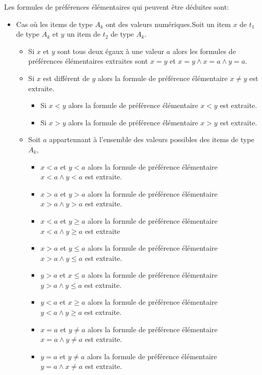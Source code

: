 \documentclass[a4paper,12pt,openany,oneside]{article}
\begin{document}
Les formules de préférences élémentaires qui peuvent être déduites sont:
\begin{itemize}
	
	\item Cas où les items de type $A_k$ ont des valeurs numériques.Soit un item $x$ de $t_1$ de type $A_k$ et $y$ un item de $t_2$ de type $A_k$.\\
	
	\begin{itemize}
	
		\item Si $x$ et $y$ sont tous deux égaux à une valeur $a$ alors les formules de préférences élémentaires extraites sont $x=y$ et $x=y\wedge x=a\wedge y=a$.
		\item Si $x$ est différent de $y$ alors la formule de préférence élémentaire $x\neq y$ est extraite. 

		\begin{itemize}
			\item Si $x<y$ alors la formule de préférence élémentaire $x<y$ est extraite.
			\item Si $x>y$ alors la formule de préférence élémentaire $x>y$ est extraite.
	
		\end{itemize}
		\item Soit $a$ appartennant à l'ensemble des valeurs possibles des items de type $A_k$, 
		\begin{itemize}
			\item $x<a$ et $y<a$ alors la formule de préférence élémentaire $x<a\wedge y<a$ est extraite.
			\item $x>a$ et $y>a$ alors la formule de préférence élémentaire $x>a\wedge y>a$ est extraite. 
			\item $x<a$ et $y\geq a$ alors la formule de préférence élémentaire $x<a\wedge y\geq a$ est extraite 
			\item $x>a$ et $y\leq a$ alors la formule  de préférence élémentaire $x>a\wedge y\leq a$ est extraite.
			\item $y>a$ et $x\leq a$ alors la formule  de préférence élémentaire $y>a\wedge y\leq a$ est extraite.
			\item $y<a$ et $x\geq a$ alors la formule  de préférence élémentaire $y<a\wedge y\geq a$ est extraite.
			\item $x=a$ et $y\neq a$ alors la formule  de préférence élémentaire $x=a\wedge y\neq a$ est extraite.
			\item $y=a$ et $y\neq a$ alors la formule  de préférence élémentaire $y=a\wedge x\neq a$ est extraite.


\end{itemize}
\end{itemize}
\end{itemize}
\end{document}
